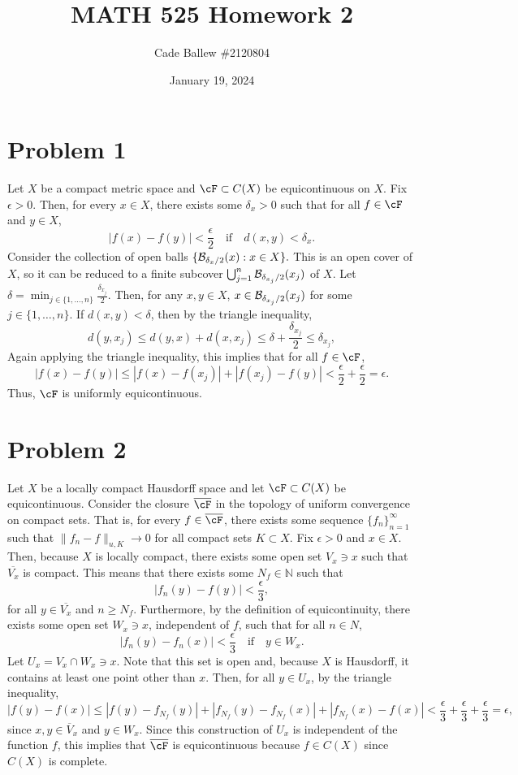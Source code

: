 \documentclass{article}
\title{MATH 525 Homework 2}
\author{Cade Ballew \#2120804}
\date{January 19, 2024}
\begin{document}
	
\maketitle
	
\section{Problem 1}
Let $X$ be a compact metric space and $\cF\subset C(X)$ be equicontinuous on $X$. Fix $\epsilon>0$. Then, for every $x\in X$, there exists some $\delta_x>0$ such that for all $f\in\cF$ and $y\in X$,
\[
|f(x)-f(y)|<\frac{\epsilon}{2}\quad\text{if}\quad d(x,y)<\delta_x.
\]
Consider the collection of open balls $\{{\cal B}_{\delta_x/2}(x):x\in X\}.$ This is an open cover of $X$, so it can be reduced to a finite subcover $\bigcup_{j=1}^n{\cal B}_{\delta_{x_j}/2}(x_j)$ of $X$. Let $\delta=\min_{j\in\{1,\ldots,n\}}\frac{\delta_{x_j}}{2}$. Then, for any $x,y\in X$, $x\in{\cal B}_{\delta_{x_j}/2}(x_j)$ for some $j\in\{1,\ldots,n\}$. If $d(x,y)<\delta$, then by the triangle inequality,
\[
d(y,x_j)\leq d(y,x)+d(x,x_j)\leq \delta+\frac{\delta_{x_j}}{2}\leq \delta_{x_j},
\]
Again applying the triangle inequality, this implies that for all $f\in\cF$,
\[
|f(x)-f(y)|\leq|f(x)-f(x_j)|+|f(x_j)-f(y)|<\frac{\epsilon}{2}+\frac{\epsilon}{2}=\epsilon.
\]
Thus, $\cF$ is uniformly equicontinuous. 

\section{Problem 2}
Let $X$ be a locally compact Hausdorff space and let $\cF\subset C(X)$ be equicontinuous. Consider the closure $\overline \cF$ in the topology of uniform convergence on compact sets. That is, for every $f\in\overline\cF$, there exists some sequence $\{f_n\}_{n=1}^\infty$ such that $\|f_n-f\|_{u,K}\to0$ for all compact sets $K\subset X$. Fix $\epsilon>0$ and $x\in X$. Then, because $X$ is locally compact, there exists some open set $V_x\ni x$ such that $\overline{V_x}$ is compact. This means that there exists some $N_f\in\mathbb{N}$ such that 
\[
|f_n(y)-f(y)|<\frac{\epsilon}{3},
\]
for all $y\in\overline{V_x}$ and $n\geq N_f$. Furthermore, by the definition of equicontinuity, there exists some open set $W_x\ni x$, independent of $f$, such that for all $n\in N$, 
\[
|f_n(y)-f_n(x)|<\frac{\epsilon}{3}\quad\text{if}\quad y\in W_x.
\]
Let $U_x=V_x\cap W_x\ni x$. Note that this set is open and, because $X$ is Hausdorff, it contains at least one point other than $x$. Then, for all $y\in U_x$, by the triangle inequality,
\[
|f(y)-f(x)|\leq|f(y)-f_{N_f}(y)|+|f_{N_f}(y)-f_{N_f}(x)|+|f_{N_f}(x)-f(x)|<\frac{\epsilon}{3}+\frac{\epsilon}{3}+\frac{\epsilon}{3}=\epsilon,
\]
since $x,y\in \overline V_x$ and $y\in W_x$. Since this construction of $U_x$ is independent of the function $f$, this implies that $\overline\cF$ is equicontinuous because $f\in C(X)$ since $C(X)$ is complete. 
\end{document}
